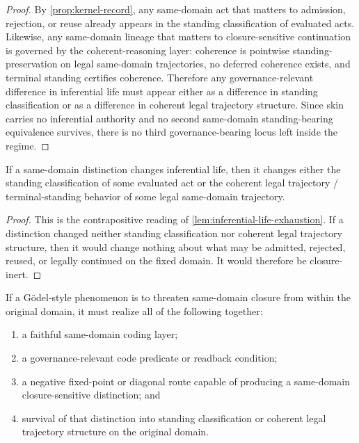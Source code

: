 \begin{proof}
By \cref{prop:kernel-record}, any same-domain act that matters to admission, rejection, or reuse already appears in the standing classification of evaluated acts. Likewise, any same-domain lineage that matters to closure-sensitive continuation is governed by the coherent-reasoning layer: coherence is pointwise standing-preservation on legal same-domain trajectories, no deferred coherence exists, and terminal standing certifies coherence. Therefore any governance-relevant difference in inferential life must appear either as a difference in standing classification or as a difference in coherent legal trajectory structure. Since skin carries no inferential authority and no second same-domain standing-bearing equivalence survives, there is no third governance-bearing locus left inside the regime.
\end{proof}

\begin{lemma}
\label{lem:closure-transmission}
If a same-domain distinction changes inferential life, then it changes either the standing classification of some evaluated act or the coherent legal trajectory / terminal-standing behavior of some legal same-domain trajectory.
\end{lemma}

\begin{proof}
This is the contrapositive reading of \cref{lem:inferential-life-exhaustion}. If a distinction changed neither standing classification nor coherent legal trajectory structure, then it would change nothing about what may be admitted, rejected, reused, or legally continued on the fixed domain. It would therefore be closure-inert.
\end{proof}

\begin{theorem}
\label{thm:godel-prerequisites}
If a G\"odel-style phenomenon is to threaten same-domain closure from within the original domain, it must realize all of the following together:
\begin{enumerate}[label=(\roman*), leftmargin=2.6em]
    \item a faithful same-domain coding layer;
    \item a governance-relevant code predicate or readback condition;
    \item a negative fixed-point or diagonal route capable of producing a same-domain closure-sensitive distinction; and
    \item survival of that distinction into standing classification or coherent legal trajectory structure on the original domain.
\end{enumerate}
\end{theorem}

